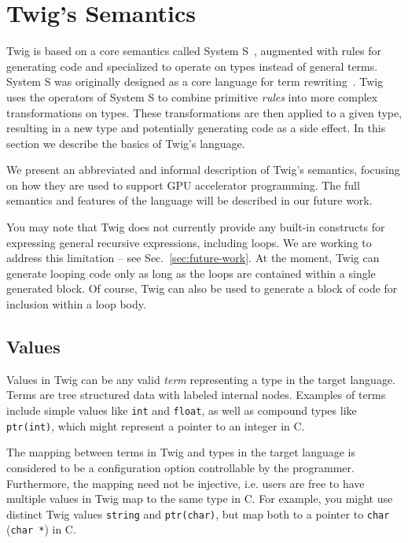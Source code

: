 
\section{Twig's Semantics}
\label{sec:semantics}

Twig is based on a core semantics called System S~\cite{system-s}, augmented with rules for generating code and specialized to operate on types instead of general terms. System S was originally designed as a core language for term rewriting~\cite{baader98rewriting}. Twig uses the operators of System S to combine primitive \emph{rules} into more complex transformations on types. These transformations are then applied to a given type, resulting in a new type and potentially generating code as a side effect. In this section we describe the basics of Twig's language.

We present an abbreviated and informal description of Twig's semantics, focusing on how they are used to support GPU accelerator programming. The full semantics and features of the language will be described in our future work.

You may note that Twig does not currently provide any built-in constructs for expressing general recursive expressions, including loops. We are working to address this limitation -- see Sec.~\ref{sec:future-work}. At the moment, Twig can generate looping code only as long as the loops are contained within a single generated block. Of course, Twig can also be used to generate a block of code for inclusion within a loop body.

\subsection{Values}

Values in Twig can be any valid \emph{term} representing a type in the target language. Terms are tree structured data with labeled internal nodes. Examples of terms include simple values like \texttt{int} and \texttt{float}, as well as compound types like \texttt{ptr(int)}, which might represent a pointer to an integer in C.

The mapping between terms in Twig and types in the target language is considered to be a configuration option controllable by the programmer. Furthermore, the mapping need not be injective, i.e. users are free to have multiple values in Twig map to the same type in C. For example, you might use distinct Twig values \texttt{string} and \texttt{ptr(char)}, but map both to a pointer to \texttt{char} (\texttt{char *}) in C.

